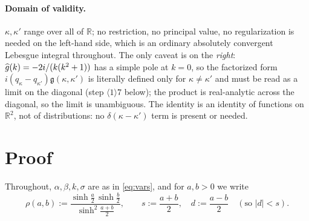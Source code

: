 \documentclass[11pt]{article}
\newcommand{\gfr}{\mathfrak g}\newcommand{\Dt}{\widetilde D^{(1)}}\newcommand{\psih}{\psi}
\begin{document}
\paragraph{Domain of validity.}
\(\kappa,\kappa'\) range over all of \(\mathbb R\); no restriction, no principal value, no
regularization is needed on the left-hand side, which is an ordinary absolutely convergent Lebesgue
integral throughout.  The only caveat is on the \emph{right}: \(\widehat g(k)=-2i/(k(k^2+1))\) has a simple
pole at \(k=0\), so the factorized form \(i(q_\kappa-q_{\kappa'})\gfr(\kappa,\kappa')\) is literally
defined only for \(\kappa\neq\kappa'\) and must be read as a limit on the diagonal
(step \(\langle1\rangle7\) below); the product is real-analytic across the diagonal, so the limit is
unambiguous.  The identity is an identity of functions on \(\mathbb R^2\), not of distributions:
no \(\delta(\kappa-\kappa')\) term is present or needed.

\section{Proof}\label{sec:proof}

Throughout, \(\alpha,\beta,k,\sigma\) are as in \eqref{eq:vars}, and for \(a,b>0\) we write
\begin{equation}\label{eq:rho}
 \rho(a,b):=\frac{\sinh\frac a2\,\sinh\frac b2}{\sinh^2\frac{a+b}2},\qquad
 s:=\frac{a+b}2,\quad d:=\frac{a-b}2\quad(\text{so }|d|<s).
\end{equation}
\end{document}
